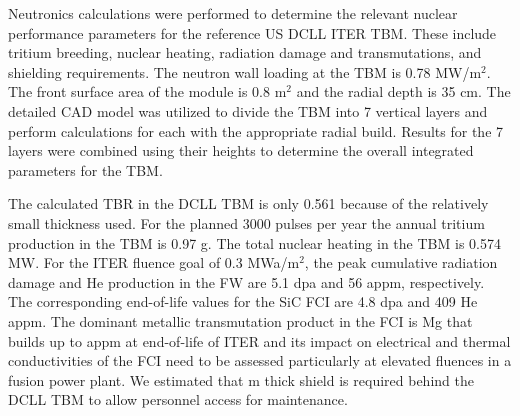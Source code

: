 Neutronics calculations were performed to determine the relevant nuclear
performance parameters for the reference US \gls{DCLL} ITER \gls{TBM}. These
include tritium breeding, nuclear heating, radiation damage and
transmutations, and shielding requirements. The neutron wall loading at the
\gls{TBM} is 0.78 MW/m$^2$. The front surface area of the module is 0.8 m$^2$
and the radial depth is 35 cm. The detailed \gls{CAD} model was utilized to
divide the \gls{TBM} into 7 vertical layers and perform calculations for each
with the appropriate radial build. Results for the 7 layers were combined
using their heights to determine the overall integrated parameters for the
\gls{TBM}.

The calculated \gls{TBR} in the \gls{DCLL} \gls{TBM} is only 0.561 because of
the relatively small thickness used. For the planned 3000 pulses per year the
annual tritium production in the \gls{TBM} is 0.97 g. The total nuclear
heating in the \gls{TBM} is 0.574 MW. For the ITER fluence goal of 0.3
MWa/m$^2$, the peak cumulative radiation damage and He production in the FW
are 5.1 dpa and 56 appm, respectively.  The corresponding end-of-life values
for the SiC \gls{FCI} are 4.8 dpa and 409 He appm. The dominant metallic
transmutation product in the \gls{FCI} is Mg that builds up to 
appm at end-of-life of ITER and its impact on electrical and thermal
conductivities of the \gls{FCI} need to be assessed particularly at elevated
fluences in a fusion power plant. We estimated that  m thick
shield is required behind the \gls{DCLL} \gls{TBM} to allow personnel access
for maintenance.


